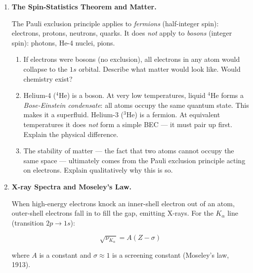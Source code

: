 \documentclass[12pt, a4paper]{book}
\begin{document}
\begin{deepbox}
\begin{enumerate}[label=\textbf{D\arabic*.}]
  \item \textbf{The Spin-Statistics Theorem and Matter.}

        The Pauli exclusion principle applies to
        \emph{fermions} (half-integer spin): electrons, protons,
        neutrons, quarks.
        It does \emph{not} apply to \emph{bosons}
        (integer spin): photons, He-4 nuclei, pions.

        \begin{enumerate}[label=(\alph*)]
          \item If electrons were bosons (no exclusion),
                all electrons in any atom would collapse
                to the $1s$ orbital.
                Describe what matter would look like.
                Would chemistry exist?
          \item Helium-4 ($^4$He) is a boson.
                At very low temperatures, liquid $^4$He
                forms a \emph{Bose-Einstein condensate}:
                all atoms occupy the same quantum state.
                This makes it a superfluid.
                Helium-3 ($^3$He) is a fermion.
                At equivalent temperatures it does \emph{not}
                form a simple BEC --- it must pair up first.
                Explain the physical difference.
          \item The stability of matter --- the fact that
                two atoms cannot occupy the same space ---
                ultimately comes from the Pauli exclusion
                principle acting on electrons.
                Explain qualitatively why this is so.
        \end{enumerate}

  \item \textbf{X-ray Spectra and Moseley's Law.}

        When high-energy electrons knock an inner-shell
        electron out of an atom, outer-shell electrons
        fall in to fill the gap, emitting X-rays.
        For the $K_\alpha$ line (transition $2p \to 1s$):

        \[
          \sqrt{\nu_{K_\alpha}} = A(Z - \sigma)
        \]

        where $A$ is a constant and $\sigma \approx 1$
        is a screening constant (Moseley's law, 1913).


\end{enumerate}
\end{deepbox}
\end{document}
